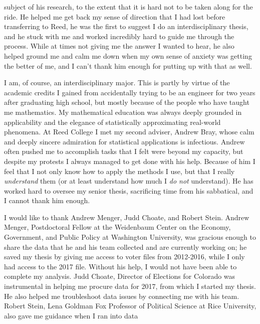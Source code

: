 \documentclass[12pt,twoside]{reedthesis}
\begin{document}
\begin{preface}
      subject of his research, to the extent that it is hard not to be taken
      along for the ride. He helped me get back my sense of direction that I
      had lost before transferring to Reed, he was the first to suggest I do
      an interdisciplinary thesis, and he stuck with me and worked incredibly
      hard to guide me through the process. While at times not giving me the
      answer I wanted to hear, he also helped ground me and calm me down when
      my own sense of anxiety was getting the better of me, and I can't thank
      him enough for putting up with that as well. \par I am, of course, an
      interdisciplinary major. This is partly by virtue of the academic
      credits I gained from accidentally trying to be an engineer for two
      years after graduating high school, but mostly because of the people who
      have taught me mathematics. My mathematical education was always deeply
      grounded in applicability and the elegance of statistically
      approximating real-world phenomena. At Reed College I met my second
      adviser, Andrew Bray, whose calm and deeply sincere admiration for
      statistical applications is infectious. Andrew often pushed me to
      accomplish tasks that I felt were beyond my capacity, but despite my
      protests I always managed to get done with his help. Because of him I
      feel that I not only know how to apply the methods I use, but that I
      really \emph{understand} them (or at least understand how much I
      \emph{do not} understand). He has worked hard to oversee my senior
      thesis, sacrificing time from his sabbatical, and I cannot thank him
      enough. \par I would like to thank Andrew Menger, Judd Choate, and
      Robert Stein. Andrew Menger, Postdoctoral Fellow at the Weidenbaum
      Center on the Economy, Government, and Public Policy at Washington
      University, was gracious enough to share the data that he and his team
      collected and are currently working on; he saved my thesis by giving me
      access to voter files from 2012-2016, while I only had access to the
      2017 file. Without his help, I would not have been able to complete my
      analysis. Judd Choate, Director of Elections for Colorado was
      instrumental in helping me procure data for 2017, from which I started
      my thesis. He also helped me troubleshoot data issues by connecting me
      with his team. Robert Stein, Lena Goldman Fox Professor of Political
      Science at Rice University, also gave me guidance when I ran into data

\end{preface}
\end{document}
